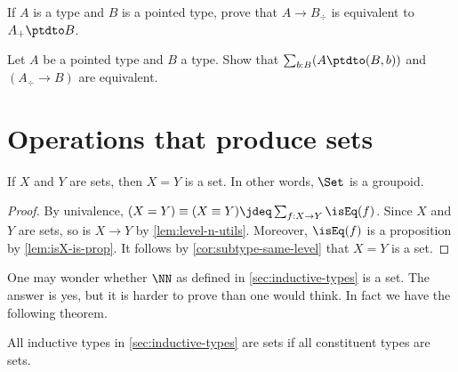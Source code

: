 \begin{xca}\label{xca:plusforgetadjoint}
If $A$ is a type and $B$ is a pointed type,
prove that $A\to B_\div$ is equivalent to $A_+\ptdto B$.
\end{xca}

\begin{xca}\label{xca:freemaps}
  Let $A$ be a pointed type and $B$ a type.
  Show that $\sum_{b:B}(A\ptdto (B,b))$ and $(A_\div\to B)$ are equivalent.
\end{xca}


\section{Operations that produce sets}
\label{sec:operations-on-sets}

\begin{lemma}\label{lem:Set-is-groupoid}
If $X$ and $Y$ are sets, then $X=Y$ is a set.
In other words, $\Set$ is a groupoid.
\end{lemma}

\begin{proof}
By univalence, $(X=Y) \equiv (X\equiv Y) \jdeq
\sum_{f:X\to Y} \isEq(f)$. Since $X$ and $Y$ are sets,
so is $X\to Y$ by \cref{lem:level-n-utils}. Moreover,
$\isEq(f)$ is a proposition by \cref{lem:isX-is-prop}.
It follows by \cref{cor:subtype-same-level} that $X=Y$ is a set.
\end{proof}

One may wonder whether $\NN$ as defined in \cref{sec:inductive-types}
is a set. The answer is yes, but it is harder to prove than one
would think. In fact we have the following theorem.

\begin{theorem}\label{thm:isset-inductive-types}
All inductive types in \cref{sec:inductive-types} are sets
if all constituent types are sets.
\end{theorem}

